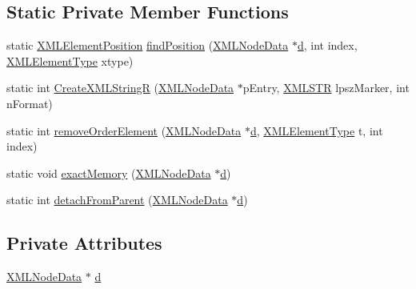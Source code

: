 \subsection*{Static Private Member Functions}
\begin{DoxyCompactItemize}
\item 
static \hyperlink{xmlParser_8h_aab10d65aadeca1f026f6416becde7432}{X\-M\-L\-Element\-Position} \hyperlink{structXMLNode_a94896a0cde53b522c9c08b0008dc0821}{find\-Position} (\hyperlink{structXMLNode_a28beb729b21b81d2a59238fa755ba700}{X\-M\-L\-Node\-Data} $\ast$\hyperlink{structXMLNode_adf30070dcb8b64a31a64e29fc44b682d}{d}, int index, \hyperlink{xmlParser_8h_a100a496e2b573b37eb4e75f00a316851}{X\-M\-L\-Element\-Type} xtype)
\item 
static int \hyperlink{structXMLNode_adb78f95c5ab86bed125d6dc98f6e76e7}{Create\-X\-M\-L\-String\-R} (\hyperlink{structXMLNode_a28beb729b21b81d2a59238fa755ba700}{X\-M\-L\-Node\-Data} $\ast$p\-Entry, \hyperlink{xmlParser_8h_a849d96105aa0c8f64b5c10d9151a3cdc}{X\-M\-L\-S\-T\-R} lpsz\-Marker, int n\-Format)
\item 
static int \hyperlink{structXMLNode_ab46101e00b853c30dc1403ced134f187}{remove\-Order\-Element} (\hyperlink{structXMLNode_a28beb729b21b81d2a59238fa755ba700}{X\-M\-L\-Node\-Data} $\ast$\hyperlink{structXMLNode_adf30070dcb8b64a31a64e29fc44b682d}{d}, \hyperlink{xmlParser_8h_a100a496e2b573b37eb4e75f00a316851}{X\-M\-L\-Element\-Type} t, int index)
\item 
static void \hyperlink{structXMLNode_af71c7d4b7b886ce4aefe99f2ec8863ac}{exact\-Memory} (\hyperlink{structXMLNode_a28beb729b21b81d2a59238fa755ba700}{X\-M\-L\-Node\-Data} $\ast$\hyperlink{structXMLNode_adf30070dcb8b64a31a64e29fc44b682d}{d})
\item 
static int \hyperlink{structXMLNode_a4b2900ce22afa1ada19df957ad7dfafc}{detach\-From\-Parent} (\hyperlink{structXMLNode_a28beb729b21b81d2a59238fa755ba700}{X\-M\-L\-Node\-Data} $\ast$\hyperlink{structXMLNode_adf30070dcb8b64a31a64e29fc44b682d}{d})
\end{DoxyCompactItemize}
\subsection*{Private Attributes}
\begin{DoxyCompactItemize}
\item 
\hyperlink{structXMLNode_a28beb729b21b81d2a59238fa755ba700}{X\-M\-L\-Node\-Data} $\ast$ \hyperlink{structXMLNode_adf30070dcb8b64a31a64e29fc44b682d}{d}
\end{DoxyCompactItemize}


